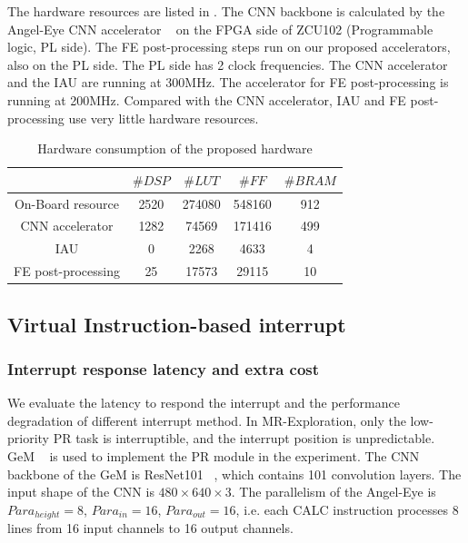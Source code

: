 The hardware resources are listed in . The CNN backbone is calculated by the Angel-Eye CNN accelerator ~\cite{guo2017angel} on the FPGA side of ZCU102 (Programmable logic, PL side). The FE post-processing steps run on our proposed accelerators, also on the PL side. The PL side has 2 clock frequencies. The CNN accelerator and the IAU are running at 300MHz. The accelerator for FE post-processing is running at 200MHz. Compared with the CNN accelerator, IAU and FE post-processing use very little hardware resources.

\begin{table}[t]
  \centering
  \caption{Hardware consumption of the proposed hardware}
\begin{tabular}{|c|c|c|c|c|}
  \hline
        & $\# DSP$ & $\# LUT$ & $\# FF$ & $\# BRAM$ \\
  \hline
  On-Board resource &   2520   &  274080      &  548160     & 912 \\
  \hline
  CNN accelerator &   1282   &  74569      &   171416    & 499 \\
  \hline
  IAU &   0   &  2268      &   4633    & 4 \\
  \hline
  FE post-processing & 25      &  17573     &   29115    & 10 \\
  \hline
  \end{tabular}%
  
  \label{tab:hardware}%
\end{table}%


\subsection{Virtual Instruction-based interrupt }

\subsubsection{ Interrupt response latency and extra cost}


We evaluate the latency to respond the interrupt and the performance degradation of different interrupt method. In MR-Exploration, only the low-priority PR task is interruptible, and the interrupt position is unpredictable. GeM  ~\cite{radenovic2018fine} is used to implement the PR module in the experiment.
The CNN backbone of the GeM is ResNet101  ~\cite{he2016deep}, which contains 101 convolution layers. The input shape of the CNN is $480 \times 640 \times 3$. The parallelism of the Angel-Eye is $Para_{height}=8$, $Para_{in}=16$, $Para_{out}=16$, i.e. each CALC instruction processes 8 lines from 16 input channels to 16 output channels. 

